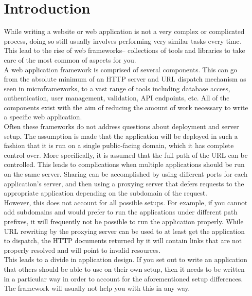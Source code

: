 \documentclass{sig-alternate}
\begin{document}
\printccsdesc


\newpage
\section{Introduction}
While writing a website or web application is not a very complex or complicated process, doing so still usually involves performing very similar tasks every time. This lead to the rise of web frameworks-- collections of tools and libraries to take care of the most common of aspects for you. \\

A web application framework is comprised of several components. This can go from the absolute minimum of an HTTP server and URL dispatch mechanism as seen in microframeworks\cite{microframeworks}, to a vast range of tools including database access, authentication, user management, validation, API endpoints, etc. All of the components exist with the aim of reducing the amount of work necessary to write a specific web application. \\

Often these frameworks do not address questions about deployment and server setup. The assumption is made that the application will be deployed in such a fashion that it is run on a single public-facing domain, which it has complete control over. More specifically, it is assumed that the full path of the URL can be controlled. This leads to complications when multiple applications should be run on the same server. Sharing can be accomplished by using different ports for each application's server, and then using a proxying server that defers requests to the appropriate application depending on the subdomain of the request. \\

However, this does not account for all possible setups. For example, if you cannot add subdomains and would prefer to run the applications under different path prefixes, it will frequently not be possible to run the application properly. While URL rewriting by the proxying server can be used to at least get the application to dispatch, the HTTP documents returned by it will contain links that are not properly resolved and will point to invalid resources. \\

This leads to a divide in application design. If you set out to write an application that others should be able to use on their own setup, then it needs to be written in a particular way in order to account for the aforementioned setup differences. The framework will usually not help you with this in any way. \\
\end{document}

